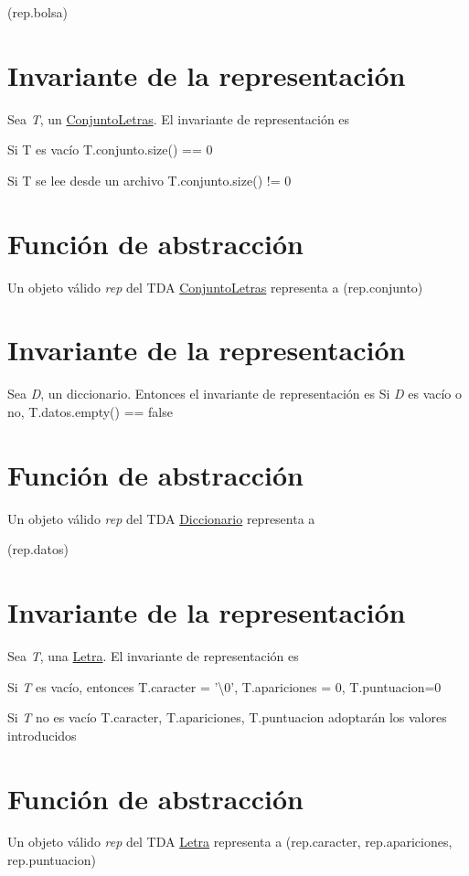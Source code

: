 (rep.\-bolsa)\hypertarget{repConjunto_invConjunto}{}\section{Invariante de la representación}\label{repConjunto_invConjunto}
Sea {\itshape T}, un \hyperlink{classConjuntoLetras}{Conjunto\-Letras}. El invariante de representación es
\begin{DoxyItemize}
\item Si T es vacío T.\-conjunto.\-size() == 0
\item Si T se lee desde un archivo T.\-conjunto.\-size() != 0
\end{DoxyItemize}\hypertarget{repConjunto_faConjunto}{}\section{Función de abstracción}\label{repConjunto_faConjunto}
Un objeto válido {\itshape rep} del T\-D\-A \hyperlink{classConjuntoLetras}{Conjunto\-Letras} representa a (rep.\-conjunto)\hypertarget{repConjunto_invConjunto}{}\section{Invariante de la representación}\label{repConjunto_invConjunto}
Sea {\itshape D}, un diccionario. Entonces el invariante de representación es Si {\itshape D} es vacío o no, T.\-datos.\-empty() == false\hypertarget{repConjunto_faConjunto}{}\section{Función de abstracción}\label{repConjunto_faConjunto}
Un objeto válido {\itshape rep} del T\-D\-A \hyperlink{classDiccionario}{Diccionario} representa a

(rep.\-datos)\hypertarget{repConjunto_invConjunto}{}\section{Invariante de la representación}\label{repConjunto_invConjunto}
Sea {\itshape T}, una \hyperlink{classLetra}{Letra}. El invariante de representación es
\begin{DoxyItemize}
\item Si {\itshape T} es vacío, entonces T.\-caracter = '\textbackslash{}0', T.\-apariciones = 0, T.\-puntuacion=0
\item Si {\itshape T} no es vacío T.\-caracter, T.\-apariciones, T.\-puntuacion adoptarán los valores introducidos
\end{DoxyItemize}\hypertarget{repConjunto_faConjunto}{}\section{Función de abstracción}\label{repConjunto_faConjunto}
Un objeto válido {\itshape rep} del T\-D\-A \hyperlink{classLetra}{Letra} representa a (rep.\-caracter, rep.\-apariciones, rep.\-puntuacion) 